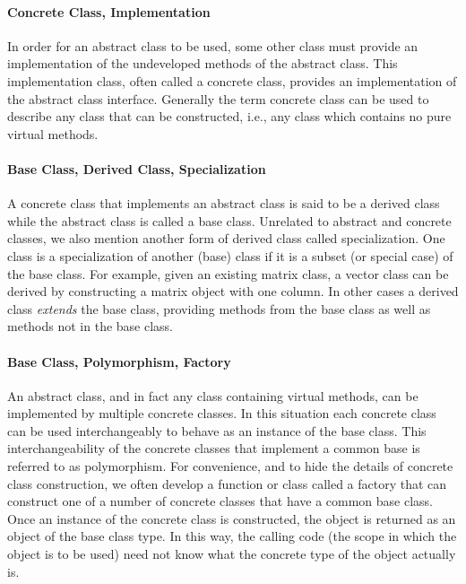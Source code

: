 \documentclass[12pt,relax]{SANDreport}
\begin{document}
\paragraph{Concrete Class, Implementation}  In order for an abstract class to
be used, some other class must provide an implementation of the undeveloped
methods of the abstract class. This implementation class, often called a
concrete class, provides an implementation of the abstract class interface.
Generally the term concrete class can be used to describe any class that can
be constructed, i.e., any class which contains no pure virtual methods.

\paragraph{Base Class, Derived Class, Specialization} 
A concrete class that implements an abstract class is said to be a derived
class while the abstract class is called a base class.  Unrelated to abstract
and concrete classes, we also mention another form of derived class called
specialization.  One class is a specialization of another (base) class if it
is a subset (or special case) of the base class.  For example, given an
existing matrix class, a vector class can be derived by constructing a matrix
object with one column. In other cases a derived class {\it extends} the base
class, providing methods from the base class as well as methods not in the
base class.

\paragraph{Base Class, Polymorphism, Factory}
An abstract class, and in fact any class containing virtual methods, can be
implemented by multiple concrete classes.  In this situation each concrete
class can be used interchangeably to behave as an instance of the base class.
This interchangeability of the concrete classes that implement a common base
is referred to as polymorphism.  For convenience, and to hide the details of
concrete class construction, we often develop a function or class called a
factory that can construct one of a number of concrete classes that have a
common base class.  Once an instance of the concrete class is constructed, the
object is returned as an object of the base class type. In this way, the
calling code (the scope in which the object is to be used) need not know what
the concrete type of the object actually is.
\end{document}
